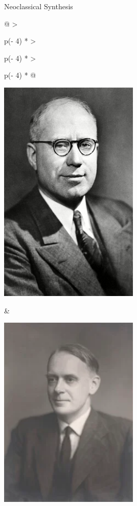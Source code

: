 \begin{frame}{Neoclassical Synthesis}
\protect\hypertarget{neoclassical-synthesis}{}


\begin{longtable}[]{@{}
  >{\raggedright\arraybackslash}p{(\columnwidth - 4\tabcolsep) * }
  >{\raggedright\arraybackslash}p{(\columnwidth - 4\tabcolsep) * }
  >{\raggedright\arraybackslash}p{(\columnwidth - 4\tabcolsep) * }@{}}
\toprule\noalign{}
\begin{minipage}[b]{\linewidth}\raggedright
\includegraphics[width=0.5\textwidth,height=\textheight]{assets/hansen.jpg}
\end{minipage} & \begin{minipage}[b]{\linewidth}\raggedright
\includegraphics[width=0.5\textwidth,height=\textheight]{assets/hicks.png}

\end{minipage}
\end{longtable}
\end{frame}
